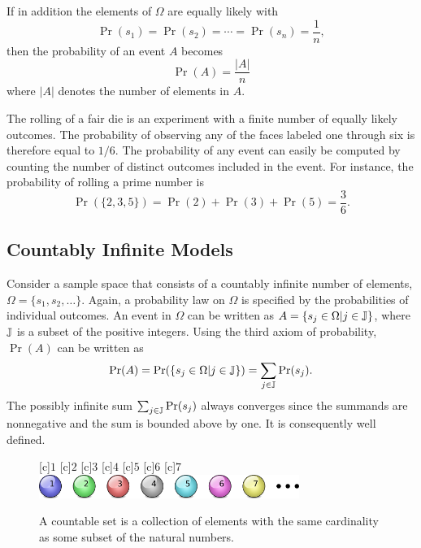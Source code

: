 If in addition the elements of $\Omega$ are equally likely with
\begin{equation*}
\Pr (s_1) = \Pr (s_2) = \cdots = \Pr (s_n) = \frac{1}{n} ,
\end{equation*}
then the probability of an event $A$ becomes
\begin{equation} \label{equation:ProbEquiProbableOutcomes}
\Pr (A) = \frac{ |A| }{n}
\end{equation}
where $|A|$ denotes the number of elements in $A$.

\begin{example}
The rolling of a fair die is an experiment with a finite number of equally likely outcomes.
The probability of observing any of the faces labeled one through six is therefore equal to $1/6$.
The probability of any event can easily be computed by counting the number of distinct outcomes included in the event.
For instance, the probability of rolling a prime number is
\begin{equation*}
\Pr ( \{ 2, 3, 5 \} )
= \Pr (2) + \Pr(3) + \Pr(5) = \frac{3}{6} .
\end{equation*}
\end{example}


\subsection{Countably Infinite Models}

Consider a sample space that consists of a countably infinite number of elements, $\Omega = \{ s_1, s_2, \ldots \}$.
Again, a probability law on $\Omega$ is specified by the probabilities of individual outcomes.
An event in $\Omega$ can be written as $A = \{ s_j \in \Omega | j \in \mathbb{J} \}$, where $\mathbb{J}$ is a subset of the positive integers.
Using the third axiom of probability, $\Pr (A)$ can be written as
\begin{equation*}
\Pr (A)
= \Pr ( \{ s_j \in \Omega | j \in \mathbb{J} \} )
= \sum_{j \in \mathbb{J}} \Pr (s_j) .
\end{equation*}
The possibly infinite sum $\sum_{j \in \mathbb{J}} \Pr (s_j)$ always converges since the summands are nonnegative and the sum is bounded above by one.
It is consequently well defined.

\begin{figure}[htb!]
\begin{center}
\begin{psfrags}
[c]{$1$}
[c]{$2$}
[c]{$3$}
[c]{$4$}
[c]{$5$}
[c]{$6$}
[c]{$7$}
\includegraphics[height=0.765cm]{Figures/2Chapter/countablespace}
\end{psfrags}
\caption{A countable set is a collection of elements with the same cardinality as some subset of the natural numbers.}
\end{center}
\end{figure}

